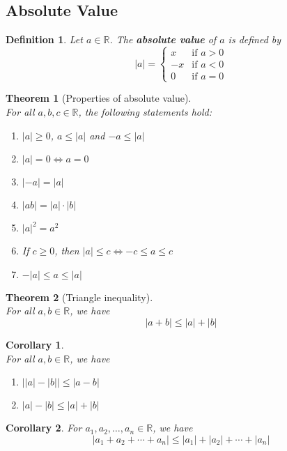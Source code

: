 \documentclass[12pt]{article}
\newtheorem{definition}{Definition}[section]
\newtheorem{theorem}{Theorem}[section]
\newtheorem{corollary}{Corollary}[section]
\theoremstyle{definition}
\begin{document}
\subsection{Absolute Value}
\begin{definition}\normalfont Let $a\in\mathbb{R}$. The \textbf{absolute value} of $a$ is defined by
\begin{equation*}
|a|=\begin{cases}
x &\text{if } a> 0\\
-x &\text{if } a<0\\
0 &\text{if }a=0
\end{cases}
\end{equation*}
\end{definition}
\begin{theorem}[Properties of absolute value]\hfill\\
\normalfont For all $a,b,c\in\mathbb{R}$, the following statements hold:
\begin{enumerate}[label=(\roman*)]
\item $|a|\geq 0$, $a\leq |a|$ and $-a\leq |a|$
\item $|a|=0\Leftrightarrow a=0$
\item $|-a|=|a|$
\item $|ab|=|a|\cdot|b|$
\item $|a|^2 = a^2$
\item If $c\geq 0$, then $|a|\leq c\Leftrightarrow -c\leq a\leq c$
\item $-|a|\leq a\leq|a|$
\end{enumerate}
\end{theorem}
\begin{theorem}[Triangle inequality]
\hfill\\
\normalfont For all $a,b\in\mathbb{R}$, we have
\[
|a+b|\leq |a|+|b|
\]
\end{theorem}
\begin{corollary}
\hfill\\
\normalfont For all $a,b\in\mathbb{R}$, we have
\begin{enumerate}[label=(\roman*)]
\item $\bigl\lvert\lvert a\rvert -\lvert b\rvert \bigr\rvert\leq|a-b|$
\item $\lvert a\rvert -\lvert b\rvert \leq|a|+|b|$
\end{enumerate}
\end{corollary}
\begin{corollary}\normalfont For $a_1,a_2,\ldots,a_n\in\mathbb{R}$, we have
\[
|a_1+a_2+\cdots+a_n|\leq|a_1|+|a_2|+\cdots+|a_n|
\]
\end{corollary}
\clearpage
\end{document}
